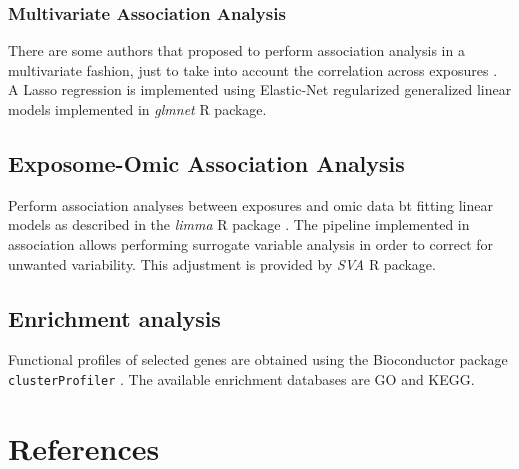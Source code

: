 \documentclass[
]{book}
\begin{document}
\hypertarget{multivariate-association-analysis}{%
\subsection{Multivariate Association Analysis}\label{multivariate-association-analysis}}

There are some authors that proposed to perform association analysis in a multivariate fashion, just to take into account the correlation across exposures \citet{agier2016systematic} . A Lasso regression is implemented using Elastic-Net regularized generalized linear models implemented in \emph{glmnet} R package.

\hypertarget{exposome-omic-association-analysis}{%
\section{Exposome-Omic Association Analysis}\label{exposome-omic-association-analysis}}

Perform association analyses between exposures and omic data bt fitting linear models as described in the \emph{limma} R package \citet{ritchie2015limma} . The pipeline implemented in association allows performing surrogate variable analysis in order to correct for unwanted variability. This adjustment is provided by \emph{SVA} R package.

\hypertarget{enrichment-analysis-1}{%
\section{Enrichment analysis}\label{enrichment-analysis-1}}

Functional profiles of selected genes are obtained using the Bioconductor package \texttt{clusterProfiler} \citet{clusterprofiler} . The available enrichment databases are GO and KEGG.

\hypertarget{references}{%
\chapter{References}\label{references}}

\hypertarget{refs}{}

  
\end{document}
